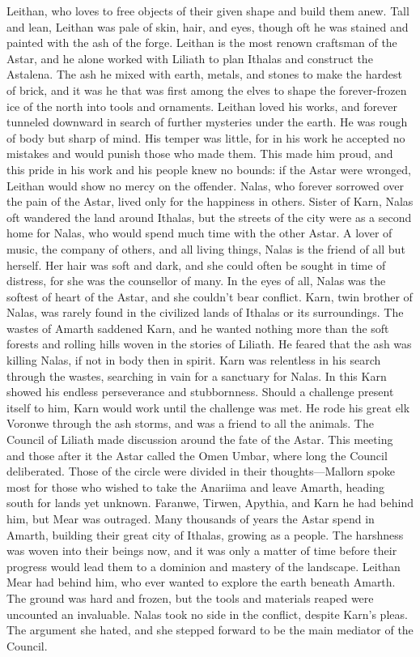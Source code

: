 \documentclass[smalldemyvopaper,11pt,twoside,onecolumn,openright,extrafontsizes]{memoir}
\begin{document}
Leithan, who loves to free objects of their given shape and build them anew. Tall and lean, Leithan was pale of skin, hair, and eyes, though oft he was stained and painted with the ash of the forge. Leithan is the most renown craftsman of the Astar, and he alone worked with Liliath to plan Ithalas and construct the Astalena. The ash he mixed with earth, metals, and stones to make the hardest of brick, and it was he that was first among the elves to shape the forever-frozen ice of the north into tools and ornaments. Leithan loved his works, and forever tunneled downward in search of further mysteries under the earth. He was rough of body but sharp of mind. His temper was little, for in his work he accepted no mistakes and would punish those who made them. This made him proud, and this pride in his work and his people knew no bounds: if the Astar were wronged, Leithan would show no mercy on the offender.
Nalas, who forever sorrowed over the pain of the Astar, lived only for the happiness in others. Sister of Karn, Nalas oft wandered the land around Ithalas, but the streets of the city were as a second home for Nalas, who would spend much time with the other Astar. A lover of music, the company of others, and all living things, Nalas is the friend of all but herself. Her hair was soft and dark, and she could often be sought in time of distress, for she was the counsellor of many. In the eyes of all, Nalas was the softest of heart of the Astar, and she couldn’t bear conflict.
Karn, twin brother of Nalas, was rarely found in the civilized lands of Ithalas or its surroundings. The wastes of Amarth saddened Karn, and he wanted nothing more than the soft forests and rolling hills woven in the stories of Liliath. He feared that the ash was killing Nalas, if not in body then in spirit. Karn was relentless in his search through the wastes, searching in vain for a sanctuary for Nalas. In this Karn showed his endless perseverance and stubbornness. Should a challenge present itself to him, Karn would work until the challenge was met.  He rode his great elk Voronwe through the ash storms, and was a friend to all the animals.
The Council of Liliath made discussion around the fate of the Astar. This meeting and those after it the Astar called the Omen Umbar, where long the Council deliberated. Those of the circle were divided in their thoughts—Mallorn spoke most for those who wished to take the Anariima and leave Amarth, heading south for lands yet unknown. Faranwe, Tirwen, Apythia, and Karn he had behind him, but Mear was outraged. Many thousands of years the Astar spend in Amarth, building their great city of Ithalas, growing as a people. The harshness was woven into their beings now, and it was only a matter of time before their progress would lead them to a dominion and mastery of the landscape. Leithan Mear had behind him, who ever wanted to explore the earth beneath Amarth. The ground was hard and frozen, but the tools and materials reaped were uncounted an invaluable. Nalas took no side in the conflict, despite Karn’s pleas. The argument she hated, and she stepped forward to be the main mediator of the Council.
\end{document}
